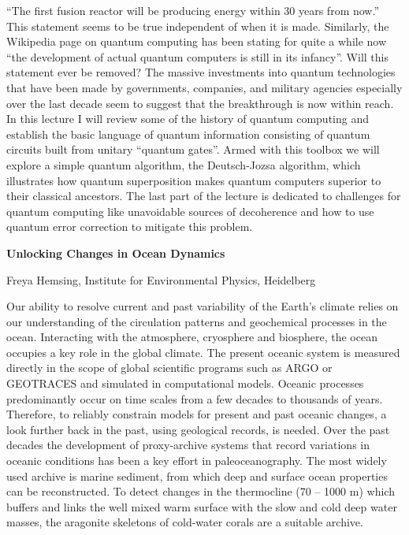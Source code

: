 \noindent “The first fusion reactor will be producing energy within 30 years from now.” This statement seems to be true independent of when it is made. Similarly, the Wikipedia page on quantum computing has been stating for quite a while now “the development of actual quantum computers is still in its infancy”. Will this statement ever be removed? The massive investments into quantum technologies that have been made by governments, companies, and military agencies especially over the last decade seem to suggest that the breakthrough is now within reach. 
In this lecture I will review some of the history of quantum computing and establish the basic language of quantum information consisting of quantum circuits built from unitary “quantum gates”. Armed with this toolbox we will explore a simple quantum algorithm, the Deutsch-Jozsa algorithm, which illustrates how quantum superposition makes quantum computers superior to their classical ancestors. The last part of the lecture is dedicated to challenges for quantum computing like unavoidable sources of decoherence and how to use quantum error correction to mitigate this problem.
\par
\newpage

\begin{center}
{{\large\bfseries Unlocking Changes in Ocean Dynamics}\par} \medskip

{\large Freya Hemsing, Institute for Environmental Physics, Heidelberg\par}
\end{center}

\noindent 
Our ability to resolve current and past variability of the Earth’s climate relies on our understanding of the circulation patterns and geochemical processes in the ocean. Interacting with the atmosphere, cryosphere and biosphere, the ocean occupies a key role in the global climate. The present oceanic system is measured directly in the scope of global scientific programs such as ARGO or GEOTRACES and simulated in computational models. Oceanic processes predominantly occur on time scales from a few decades to thousands of years. Therefore, to reliably constrain models for present and past oceanic changes, a look further back in the past, using geological records, is needed. Over the past decades the development of proxy-archive systems that record variations in oceanic conditions has been a key effort in paleoceanography. The most widely used archive is marine sediment, from which deep and surface ocean properties can be reconstructed. To detect changes in the thermocline (70 – 1000 m) which buffers and links the well mixed warm surface with the slow and cold deep water masses, the aragonite skeletons of cold-water corals are a suitable archive.

